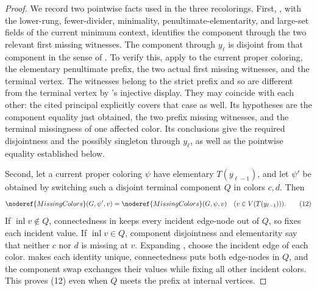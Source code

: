 \begin{proof}
We record two pointwise facts used in the three recolorings.  First,
, with the lower-rung, fewer-divider, minimality,
penultimate-elementarity, and large-set fields of the current minimum
context, identifies the component through the two relevant first missing
witnesses.  The component through \(y_\ell\) is disjoint from that
component in the sense of .  To verify this,
apply  to the current
proper coloring, the elementary penultimate prefix, the two actual
first missing witnesses, and the terminal vertex.  The witnesses
belong to the strict prefix and so are different from the terminal
vertex by 's injective display.  They may
coincide with each other: the cited principal explicitly covers that
case as well.  Its hypotheses are the component equality just obtained,
the two prefix missing witnesses, and the terminal missingness of one
affected color.  Its conclusions give the required disjointness and
the possibly singleton  through
\(y_\ell\), as well as the pointwise equality established below.

Second, let a current proper coloring \(\psi\) have elementary
\(T(y_{\ell-1})\), and let \(\psi'\) be obtained by switching such a
disjoint terminal component \(Q\) in colors \(c,d\).  Then
\[
 \noderef{MissingColors}(G,\psi',v)=
 \noderef{MissingColors}(G,\psi,v)
             \quad(v\in V(T(y_{\ell-1}))).                  \tag{12}
\]
If \(\operatorname{inl}v\notin Q\), connectedness in
 keeps every incident edge-node out of
\(Q\), so  fixes each incident value.  If
\(\operatorname{inl}v\in Q\), component disjointness and elementarity
say that neither \(c\) nor \(d\) is missing at \(v\).  Expanding
, choose the incident edge of each color.
 makes each identity unique, connectedness
puts both edge-nodes
in \(Q\), and the component swap exchanges their values while fixing all
other incident colors.  This proves (12) even when \(Q\) meets the prefix
at internal vertices.


\end{proof}
